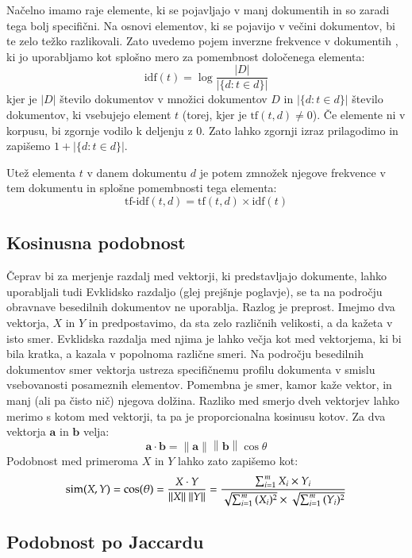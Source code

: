 Načelno imamo raje elemente, ki se pojavljajo v manj dokumentih in so
zaradi tega bolj specifični. Na osnovi elementov, ki se pojavijo v
večini dokumentov, bi te zelo težko razlikovali. Zato uvedemo pojem
inverzne frekvence v dokumentih , ki
jo uporabljamo kot splošno mero za pomembnost določenega elementa:
$$\mathrm{idf}(t) =  \log \frac{|D|}{|\{d: t \in d\}|}$$
kjer je $|D|$ število dokumentov v množici dokumentov $D$ in $|\{d : t
\in d\}|$ število dokumentov, ki vsebujejo element $t$ (torej, kjer je
$\mathrm{tf}(t,d) \neq 0$). Če elemente ni v korpusu, bi zgornje
vodilo k deljenju z 0. Zato lahko zgornji izraz prilagodimo in
zapišemo $1 + |\{d : t \in d\}|$.

Utež elementa $t$ v danem dokumentu $d$ je potem zmnožek njegove
frekvence v tem dokumentu in splošne pomembnosti tega elementa:
$$\mathrm{tf\mbox{-}idf}(t,d) = \mathrm{tf}(t,d) \times \mathrm{idf}(t)$$

\subsection{Kosinusna podobnost}

Čeprav bi za merjenje razdalj med vektorji, ki predstavljajo
dokumente, lahko uporabljali tudi Evklidsko razdaljo (glej prejšnje
poglavje), se ta na področju obravnave besedilnih dokumentov ne
uporablja. Razlog je preprost. Imejmo dva vektorja, $X$ in $Y$ in
predpostavimo, da sta zelo različnih velikosti, a da kažeta v isto
smer. Evklidska razdalja med njima je lahko večja kot med vektorjema,
ki bi bila kratka, a kazala v popolnoma različne smeri. Na področju
besedilnih dokumentov smer vektorja ustreza specifičnemu profilu
dokumenta v smislu vsebovanosti posameznih elementov. Pomembna je
smer, kamor kaže vektor, in manj (ali pa čisto nič) njegova
dolžina. Razliko med smerjo dveh vektorjev lahko merimo s kotom med
vektorji, ta pa je proporcionalna kosinusu kotov. Za dva vektorja
$\mathbf{a}$ in $\mathbf{b}$ velja:
$$\mathbf{a}\cdot\mathbf{b}
=\left\|\mathbf{a}\right\|\left\|\mathbf{b}\right\|\cos\theta$$
Podobnost med primeroma $X$ in $Y$ lahko zato zapišemo kot:
$$\text{sim}(X,Y) = \cos(\theta) = {X \cdot Y \over \|X\|\ \|Y\|}
= \frac{ \sum_{i=1}^{m}{X_i \times Y_i} }{
  \sqrt{\sum_{i=1}^{m}{(X_i)^2}} \times \sqrt{\sum_{i=1}^{m}{(Y_i)^2}}
}$$

\subsection{Podobnost po Jaccardu}

